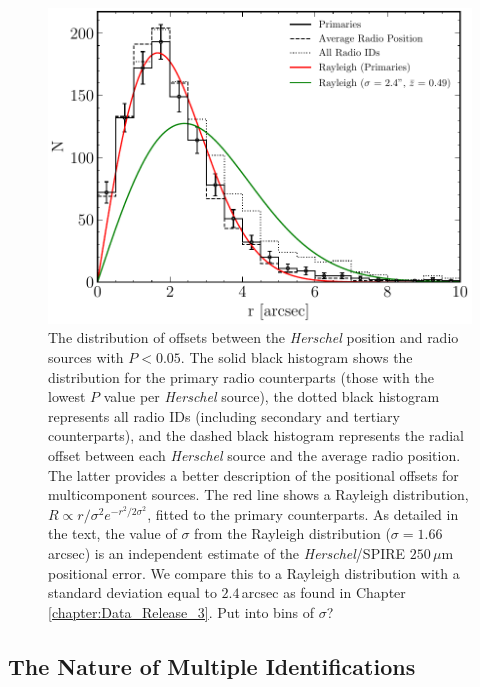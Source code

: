 \begin{figure}
	\centering
	\includegraphics[width=0.8\columnwidth]{Figures/source_counterpart_offsets.pdf}
	\caption[Distribution of radial offsets between \textit{Herschel} sources and radio IDs]{The distribution of offsets between the \textit{Herschel} position and radio sources with $P < 0.05$. The solid black histogram shows the distribution for the primary radio counterparts (those with the lowest $P$ value per \textit{Herschel} source), the dotted black histogram represents all radio IDs (including secondary and tertiary counterparts), and the dashed black histogram represents the radial offset between each \textit{Herschel} source and the average radio position. The latter provides a better description of the positional offsets for multicomponent sources. The red line shows a Rayleigh distribution, $R \propto r/\sigma^2 e^{-r^2/2\sigma^2}$, fitted to the primary counterparts. As detailed in the text, the value of $\sigma$ from the Rayleigh distribution ($\sigma = 1.66\,$arcsec) is an independent estimate of the \textit{Herschel}/SPIRE $250\,\mu$m positional error. We compare this to a Rayleigh distribution with a standard deviation equal to $2.4\,$arcsec as found in Chapter \ref{chapter:Data_Release_3}. {\color{red}Put into bins of $\sigma$?}}
	\label{fig:source_counterpart_offset}
\end{figure}

\subsection{The Nature of Multiple Identifications}
\label{sec:multiple_systems}

